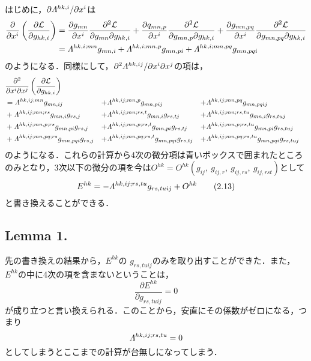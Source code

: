 \documentclass[main]{subfiles}
\begin{document}
はじめに，\(\partial \varLambda^{hk,i} / \partial x^i\)は
\begin{align*}
    \frac{\partial}{\partial x^{i}}\left(\frac{\partial \mathcal{L}}{\partial g_{hk,i}}\right) & = \frac{\partial g_{m n}}{\partial x^{i}} \frac{\partial^{2} \mathcal{L}}{\partial g_{m n} \partial g_{h k, i}}+\frac{\partial q_{m n, p}}{\partial x^{i}} \frac{\partial^{2} \mathcal{L}}{\partial g_{m n, p} \partial g_{h k, i}} +\frac{\partial g_{m n, p q}}{\partial x^{i}} \frac{\partial^{2} \mathcal{L}}{\partial g_{m n, p q} \partial g_{h k, i}} \\
    & = \varLambda^{hk,i;mn} g_{mn,i} +\varLambda^{hk,i;mn,p} g_{mn,pi}+\varLambda^{hk,i;mn,pq} g_{mn,pqi}
\end{align*}
のようになる．同様にして，\(\partial^2 \varLambda^{hk,ij} / \partial x^i \partial x^j\)の項は，
\begin{align*}
    & \frac{\partial^2}{\partial x^{i}\partial x^{j}}\left(\frac{\partial \mathcal{L}}{\partial g_{hk,i}}\right)\\
    & = \varLambda^{hk,ij;mn} g_{mn,ij}& + & \varLambda^{hk,ij;mn,p} g_{mn,pij} & + & \varLambda^{hk,ij;mn,pq} g_{mn,pqij}
    \\
    & + \varLambda^{hk,ij;mn;rs} g_{mn,i}g_{rs,j}& + & \varLambda^{hk,ij;mn;rs,t} g_{mn,i}g_{rs,tj}      & + & \varLambda^{hk,ij;mn;rs,tu} g_{mn,i}g_{rs,tuj}      \\
    & + \varLambda^{hk,ij;mn,p;rs} g_{mn,pi}g_{rs,j} & + & \varLambda^{hk,ij;mn,p;rs,t} g_{mn,pi}g_{rs,tj}   & + & \varLambda^{hk,ij;mn,p;rs,tu} g_{mn,pi}g_{rs,tuj}   \\
    & + \varLambda^{hk,ij;mn,pq;rs} g_{mn,pqi}g_{rs,j}& + & \varLambda^{hk,ij;mn,pq;rs,t} g_{mn,pqi}g_{rs,tj} & + & \varLambda^{hk,ij;mn,pq;rs,tu} g_{mn,pqi}g_{rs,tuj}
\end{align*}
のようになる．これらの計算から4次の微分項は青いボックスで囲まれたところのみとなり，3次以下の微分の項を今は\(O^{hk} = O^{hk}(g_{ij},\: g_{ij,r}, \: g_{ij,rs},\: g_{ij,rst})\)として
\begin{equation*}
    E^{hk} =- \varLambda^{hk,ij;rs,tu} g_{rs,tuij}+O^{hk}
    \tag{2.13} \label{EL2}
\end{equation*}
と書き換えることができる．

\subsection{Lemma 1.}
先の書き換えの結果から，\(E^{hk}\)の \(g_{rs,tuij}\)のみを取り出すことができた．また，\(E^{hk}\)の中に4次の項を含まないということは，
\begin{equation*}
    \dfrac{\partial E^{hk}}{\partial g_{rs,tuij} } = 0
\end{equation*}
が成り立つと言い換えられる．このことから，安直にその係数がゼロになる，つまり
\begin{equation*}
    \varLambda^{hk,ij;rs,tu}=0
\end{equation*}
としてしまうとここまでの計算が台無しになってしまう．
\end{document}
